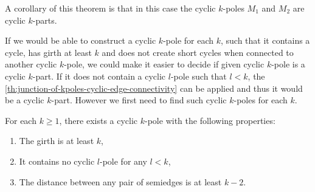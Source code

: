 \documentclass[12pt, twoside]{book}
\begin{document}
A corollary of this theorem is that in this case the cyclic $k$-poles $M_1$ and $M_2$ are cyclic $k$-parts.

If we would be able to construct a cyclic $k$-pole for each $k$, such that it contains a cycle, has girth at least $k$ and does not create short cycles when connected to another cyclic $k$-pole, we could make it easier to decide if given cyclic $k$-pole is a cyclic $k$-part. If it does not contain a cyclic $l$-pole such that $l<k$, the \cref{th:junction-of-kpoles-cyclic-edge-connectivity} can be applied and thus it would be a cyclic $k$-part. However we first need to find such cyclic $k$-poles for each $k$. 

\begin{lemma}\label{lem:cyclic-k-pole-no-short-cycles-exists}
	For each $k\geq 1$, there exists a cyclic $k$-pole with the following properties:
	\begin{enumerate}
		\item The girth is at least $k$,
		\item It contains no cyclic $l$-pole for any $l<k$,
		\item The distance between any pair of semiedges is at least $k-2$.
	\end{enumerate}
\end{lemma}
\end{document}
